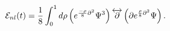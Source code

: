 \begin{equation}
\label{enl} {\cal E}_{nl}(t)=\frac18\int_0^1 d\rho\left(
e^{\frac{-\rho}{8}{\partial}^2} \Psi ^3 \right)
\overleftrightarrow{\partial}
  \left(\partial  e^{\frac{\rho}{8}{\partial}^2} \Psi \right).
\end{equation}


